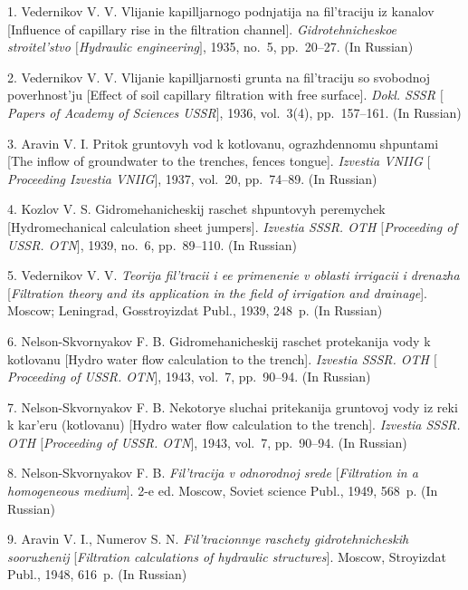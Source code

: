 {\footnotesize

\vskip 3mm


\vskip 2mm


1. Vedernikov V. V. Vlijanie kapilljarnogo podnjatija na
fil'traciju iz kanalov [Influence of capillary rise in the
filtration channel]. \textit{Gidrotehnicheskoe stroitel'stvo
$[$Hydraulic engineering$]$}, 1935, no.~5, pp.~20--27. (In
Russian)\newpage

2. Vedernikov V. V. Vlijanie kapilljarnosti grunta na fil'traciju
so svobodnoj poverhnost'ju [Effect of soil capillary filtration
with free surface]. \textit{Dokl. SSSR $[$Papers of Academy of
Sciences USSR$]$}, 1936, vol.~3(4), pp.~157--161. (In Russian)

3. Aravin V. I. Pritok gruntovyh vod k kotlovanu, ograzhdennomu
shpuntami [The inflow of groundwater to the trenches, fences
tongue]. \textit{Izvestia VNIIG $[$Proceeding Izvestia VNIIG$]$},
1937, vol.~20, pp.~74--89. (In Russian)

4. Kozlov V. S. Gidromehanicheskij raschet shpuntovyh peremychek
[Hydromechanical calculation sheet jumpers]. \textit{Izvestia
SSSR. OTH $[$Proceeding of USSR. OTN$]$}, 1939, no.~6,
pp.~89--110. (In Russian)

5. Vedernikov V. V. \textit{Teorija fil'tracii i ee primenenie v
oblasti irrigacii i drenazha} [{\it Filtration theory and its
application in the field of irrigation and drainage}]. Moscow;
Leningrad, Gosstroyizdat Publ., 1939, 248~p. (In Russian)

6. Nelson-Skvornyakov F. B. Gidromehanicheskij raschet protekanija
vody k kotlovanu [Hydro water flow calculation to the trench].
\textit{Izvestia SSSR. OTH $[$Proceeding of USSR. OTN$]$}, 1943,
vol.~7, pp.~90--94. (In Russian)

7. Nelson-Skvornyakov F. B. Nekotorye sluchai pritekanija
gruntovoj vody iz reki k kar'eru (kotlovanu)  [Hydro water flow
calculation to the trench]. \textit{Izvestia SSSR. OTH
$[$Proceeding of USSR. OTN$]$}, 1943, vol.~7, pp.~90--94. (In
Russian)

8. Nelson-Skvornyakov F. B. \textit{Fil'tracija v odnorodnoj
srede} [{\it Filtration in a homogeneous medium}]. 2-e ed. Moscow,
Soviet science Publ., 1949, 568~p. (In Russian)

9. Aravin V. I., Numerov S. N. \textit{Fil'tracionnye raschety
gidrotehnicheskih sooruzhenij} [{\it Filtration calculations of
hydraulic structures}]. Moscow, Stroyizdat Publ., 1948, 616~p. (In
Russian)

}
